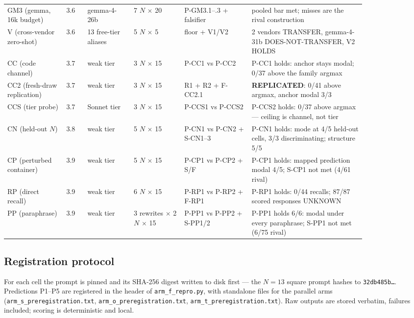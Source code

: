 \begin{center}
\begin{small}
\begin{tabular}{@{}p{0.14\linewidth}p{0.05\linewidth}p{0.11\linewidth}p{0.12\linewidth}p{0.16\linewidth}p{0.27\linewidth}@{}}
GM3 (gemma, 16k budget) & 3.6 & gemma-4-26b & 7 $N$ $\times$ 20 & P-GM3.1--.3 + falsifier & pooled bar met; misses are the rival construction \\
V (cross-vendor zero-shot) & 3.6 & 13 free-tier aliases & 5 $N$ $\times$ 5 & floor + V1/V2 & 2 vendors TRANSFER, gemma-4-31b DOES-NOT-TRANSFER, V2 HOLDS \\
CC (code channel) & 3.7 & weak tier & 3 $N$ $\times$ 15 & P-CC1 vs P-CC2 & P-CC1 holds: anchor stays modal; 0/37 above the family argmax \\
CC2 (fresh-draw replication) & 3.7 & weak tier & 3 $N$ $\times$ 15 & R1 + R2 + F-CC2.1 & \textbf{REPLICATED}: 0/41 above argmax, anchor modal 3/3 \\
CCS (tier probe) & 3.7 & Sonnet tier & 3 $N$ $\times$ 15 & P-CCS1 vs P-CCS2 & P-CCS2 holds: 0/37 above argmax --- ceiling is channel, not tier \\
CN (held-out $N$) & 3.8 & weak tier & 5 $N$ $\times$ 15 & P-CN1 vs P-CN2 + S-CN1--3 & P-CN1 holds: mode at 4/5 held-out cells, 3/3 discriminating; structure 5/5 \\
CP (perturbed container) & 3.9 & weak tier & 5 $N$ $\times$ 15 & P-CP1 vs P-CP2 + S/F & P-CP1 holds: mapped prediction modal 4/5; S-CP1 not met (4/61 rival) \\
RP (direct recall) & 3.9 & weak tier & 6 $N$ $\times$ 15 & P-RP1 vs P-RP2 + F-RP1 & P-RP1 holds: 0/44 recalls; 87/87 scored responses UNKNOWN \\
PP (paraphrase) & 3.9 & weak tier & 3 rewrites $\times$ 2 $N$ $\times$ 15 & P-PP1 vs P-PP2 + S-PP1/2 & P-PP1 holds 6/6: modal under every paraphrase; S-PP1 not met (6/75 rival) \\
\bottomrule
\end{tabular}
\end{small}
\end{center}

\subsection{Registration protocol}

For each cell the prompt is pinned and its SHA-256 digest written to disk first --- the $N = 13$
square prompt hashes to \texttt{32db485b\ldots}. Predictions P1--P5 are registered in the header of
\texttt{arm\_f\_repro.py}, with standalone files for the parallel arms (\texttt{arm\_s\_preregistration.txt},
\texttt{arm\_o\_preregistration.txt}, \texttt{arm\_t\_preregistration.txt}). Raw outputs are stored verbatim,
failures included; scoring is deterministic and local.

